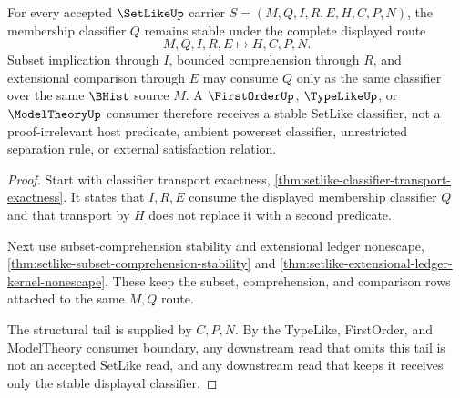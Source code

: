 \begin{theorem}
\label{thm:setlike-membership-classifier-stability}
For every accepted $\SetLikeUp$ carrier $S=(M,Q,I,R,E,H,C,P,N)$, the membership classifier $Q$ remains stable under the complete displayed route
$$
M,Q,I,R,E \longmapsto H,C,P,N .
$$
Subset implication through $I$, bounded comprehension through $R$, and extensional comparison through $E$ may consume $Q$ only as the same classifier over the same $\BHist$ source $M$. A $\FirstOrderUp$, $\TypeLikeUp$, or $\ModelTheoryUp$ consumer therefore receives a stable SetLike classifier, not a proof-irrelevant host predicate, ambient powerset classifier, unrestricted separation rule, or external satisfaction relation.
\end{theorem}
\begin{proof}
Start with classifier transport exactness, \autoref{thm:setlike-classifier-transport-exactness}. It states that $I,R,E$ consume the displayed membership classifier $Q$ and that transport by $H$ does not replace it with a second predicate.

Next use subset-comprehension stability and extensional ledger nonescape, \autoref{thm:setlike-subset-comprehension-stability} and \autoref{thm:setlike-extensional-ledger-kernel-nonescape}. These keep the subset, comprehension, and comparison rows attached to the same $M,Q$ route.

The structural tail is supplied by $C,P,N$. By the TypeLike, FirstOrder, and ModelTheory consumer boundary, any downstream read that omits this tail is not an accepted SetLike read, and any downstream read that keeps it receives only the stable displayed classifier.
\end{proof}

